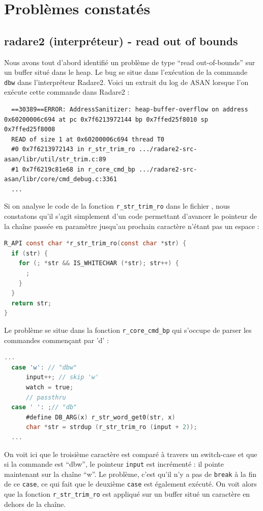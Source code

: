 \section{Problèmes constatés}

\subsection{radare2 (interpréteur) - read out of bounds}

Nous avons tout d'abord identifié un problème de type ``read out-of-bounds'' sur un buffer situé dans le heap.
Le bug se situe dans l'exécution de la commande \lstinline{dbw} dans l'interpréteur Radare2.
Voici un extrait du log de ASAN lorsque l'on exécute cette commande dans Radare2 :

\begin{lstlisting}
  ==30389==ERROR: AddressSanitizer: heap-buffer-overflow on address 0x60200006c694 at pc 0x7f6213972144 bp 0x7ffed25f8010 sp 0x7ffed25f8008
  READ of size 1 at 0x60200006c694 thread T0
  #0 0x7f6213972143 in r_str_trim_ro .../radare2-src-asan/libr/util/str_trim.c:89
  #1 0x7f6219c81e68 in r_core_cmd_bp .../radare2-src-asan/libr/core/cmd_debug.c:3361
  ...
\end{lstlisting}

Si on analyse le code de la fonction \lstinline{r_str_trim_ro} dans le fichier , nous constatons qu'il s'agit simplement d'un code permettant d'avancer le pointeur de la chaîne passée en paramètre jusqu'au prochain caractère n'étant pas un espace :

\begin{lstlisting}[language=C]
R_API const char *r_str_trim_ro(const char *str) {
  if (str) {
    for (; *str && IS_WHITECHAR (*str); str++) {
      ;
    }
  }
  return str;
}
\end{lstlisting}

Le problème se situe dans la fonction \lstinline{r_core_cmd_bp} qui s'occupe de parser les commandes commençant par 'd' :

\begin{lstlisting}[language=C]
  ...
  case 'w': // "dbw"
      input++; // skip 'w'
      watch = true;
      // passthru
  case ' ': ;// "db"
      #define DB_ARG(x) r_str_word_get0(str, x)
      char *str = strdup (r_str_trim_ro (input + 2));
  ...
\end{lstlisting}

On voit ici que le troisième caractère est comparé à travers un switch-case et que si la commande est ``dbw'', le pointeur \lstinline{input} est incrémenté : il pointe maintenant sur la chaîne ``w''.
Le problème, c'est qu'il n'y a pas de \lstinline{break} à la fin de ce \lstinline{case}, ce qui fait que le deuxième \lstinline{case} est également exécuté.
On voit alors que la fonction \lstinline{r_str_trim_ro} est appliqué sur un buffer situé un caractère en dehors de la chaîne.


